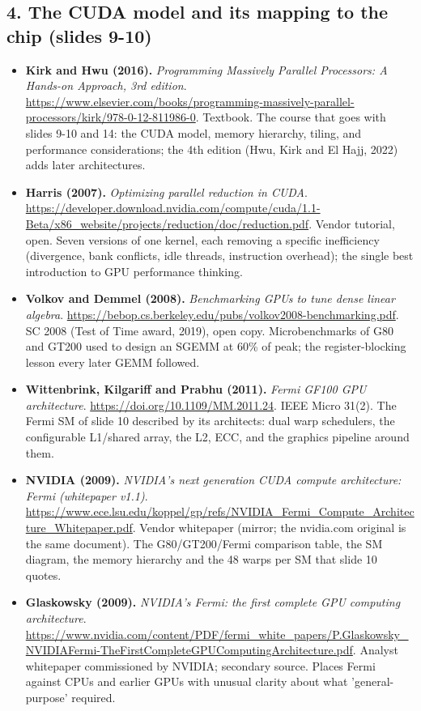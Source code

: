 \documentclass[11pt,letterpaper]{article}
\begin{document}
\subsection*{4. The CUDA model and its mapping to the chip (slides 9-10)}
\begin{itemize}[leftmargin=1.2em,itemsep=3pt]\sloppy
\item \textbf{Kirk and Hwu (2016).} \textit{Programming Massively Parallel Processors: A Hands-on Approach, 3rd edition}. \url{https://www.elsevier.com/books/programming-massively-parallel-processors/kirk/978-0-12-811986-0}. Textbook. The course that goes with slides 9-10 and 14: the CUDA model, memory hierarchy, tiling, and performance considerations; the 4th edition (Hwu, Kirk and El Hajj, 2022) adds later architectures.
\item \textbf{Harris (2007).} \textit{Optimizing parallel reduction in CUDA}. \url{https://developer.download.nvidia.com/compute/cuda/1.1-Beta/x86_website/projects/reduction/doc/reduction.pdf}. Vendor tutorial, open. Seven versions of one kernel, each removing a specific inefficiency (divergence, bank conflicts, idle threads, instruction overhead); the single best introduction to GPU performance thinking.
\item \textbf{Volkov and Demmel (2008).} \textit{Benchmarking GPUs to tune dense linear algebra}. \url{https://bebop.cs.berkeley.edu/pubs/volkov2008-benchmarking.pdf}. SC 2008 (Test of Time award, 2019), open copy. Microbenchmarks of G80 and GT200 used to design an SGEMM at 60\% of peak; the register-blocking lesson every later GEMM followed.
\item \textbf{Wittenbrink, Kilgariff and Prabhu (2011).} \textit{Fermi GF100 GPU architecture}. \url{https://doi.org/10.1109/MM.2011.24}. IEEE Micro 31(2). The Fermi SM of slide 10 described by its architects: dual warp schedulers, the configurable L1/shared array, the L2, ECC, and the graphics pipeline around them.
\item \textbf{NVIDIA (2009).} \textit{NVIDIA's next generation CUDA compute architecture: Fermi (whitepaper v1.1)}. \url{https://www.ece.lsu.edu/koppel/gp/refs/NVIDIA_Fermi_Compute_Architecture_Whitepaper.pdf}. Vendor whitepaper (mirror; the nvidia.com original is the same document). The G80/GT200/Fermi comparison table, the SM diagram, the memory hierarchy and the 48 warps per SM that slide 10 quotes.
\item \textbf{Glaskowsky (2009).} \textit{NVIDIA's Fermi: the first complete GPU computing architecture}. \url{https://www.nvidia.com/content/PDF/fermi_white_papers/P.Glaskowsky_NVIDIAFermi-TheFirstCompleteGPUComputingArchitecture.pdf}. Analyst whitepaper commissioned by NVIDIA; secondary source. Places Fermi against CPUs and earlier GPUs with unusual clarity about what 'general-purpose' required.
\end{itemize}
\end{document}
